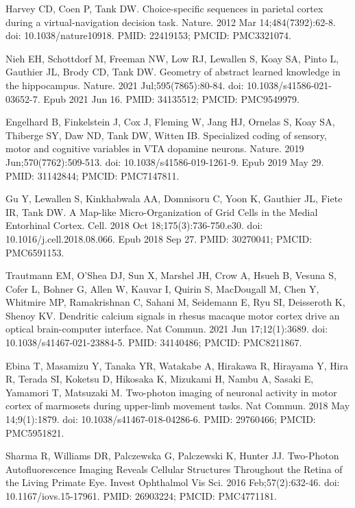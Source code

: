 \documentclass[10pt,letterpaper]{article}
\begin{document}
\begin{thebibliography}{10}
Harvey CD, Coen P, Tank DW. Choice-specific sequences in parietal cortex during a virtual-navigation decision task. Nature. 2012 Mar 14;484(7392):62-8. doi: 10.1038/nature10918. PMID: 22419153; PMCID: PMC3321074.

Nieh EH, Schottdorf M, Freeman NW, Low RJ, Lewallen S, Koay SA, Pinto L, Gauthier JL, Brody CD, Tank DW. Geometry of abstract learned knowledge in the hippocampus. Nature. 2021 Jul;595(7865):80-84. doi: 10.1038/s41586-021-03652-7. Epub 2021 Jun 16. PMID: 34135512; PMCID: PMC9549979.

Engelhard B, Finkelstein J, Cox J, Fleming W, Jang HJ, Ornelas S, Koay SA, Thiberge SY, Daw ND, Tank DW, Witten IB. Specialized coding of sensory, motor and cognitive variables in VTA dopamine neurons. Nature. 2019 Jun;570(7762):509-513. doi: 10.1038/s41586-019-1261-9. Epub 2019 May 29. PMID: 31142844; PMCID: PMC7147811.

Gu Y, Lewallen S, Kinkhabwala AA, Domnisoru C, Yoon K, Gauthier JL, Fiete IR, Tank DW. A Map-like Micro-Organization of Grid Cells in the Medial Entorhinal Cortex. Cell. 2018 Oct 18;175(3):736-750.e30. doi: 10.1016/j.cell.2018.08.066. Epub 2018 Sep 27. PMID: 30270041; PMCID: PMC6591153.

Trautmann EM, O'Shea DJ, Sun X, Marshel JH, Crow A, Hsueh B, Vesuna S, Cofer L, Bohner G, Allen W, Kauvar I, Quirin S, MacDougall M, Chen Y, Whitmire MP, Ramakrishnan C, Sahani M, Seidemann E, Ryu SI, Deisseroth K, Shenoy KV. Dendritic calcium signals in rhesus macaque motor cortex drive an optical brain-computer interface. Nat Commun. 2021 Jun 17;12(1):3689. doi: 10.1038/s41467-021-23884-5. PMID: 34140486; PMCID: PMC8211867.

Ebina T, Masamizu Y, Tanaka YR, Watakabe A, Hirakawa R, Hirayama Y, Hira R, Terada SI, Koketsu D, Hikosaka K, Mizukami H, Nambu A, Sasaki E, Yamamori T, Matsuzaki M. Two-photon imaging of neuronal activity in motor cortex of marmosets during upper-limb movement tasks. Nat Commun. 2018 May 14;9(1):1879. doi: 10.1038/s41467-018-04286-6. PMID: 29760466; PMCID: PMC5951821.

Sharma R, Williams DR, Palczewska G, Palczewski K, Hunter JJ. Two-Photon Autofluorescence Imaging Reveals Cellular Structures Throughout the Retina of the Living Primate Eye. Invest Ophthalmol Vis Sci. 2016 Feb;57(2):632-46. doi: 10.1167/iovs.15-17961. PMID: 26903224; PMCID: PMC4771181.


\end{thebibliography}
\end{document}
